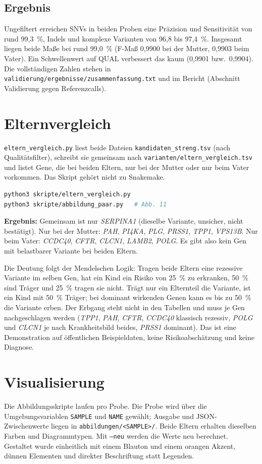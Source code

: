 \documentclass[10pt,a4paper,twocolumn]{article}
\newcommand{\gene}[1]{\textit{#1}}
\begin{document}
\subsection{Ergebnis}
Ungefiltert erreichen SNVs in beiden Proben eine Präzision und Sensitivität von rund 99,3~\%, Indels und komplexe Varianten von 96,8 bis 97,4~\%. Insgesamt liegen beide Maße bei rund 99,0~\% (F-Maß 0,9900 bei der Mutter, 0,9903 beim Vater). Ein Schwellenwert auf QUAL verbessert das kaum (0,9901 bzw.\ 0,9904). Die vollständigen Zahlen stehen in \texttt{validierung/ergebnisse/zusammenfassung.txt} und im Bericht (Abschnitt Validierung gegen Referenzcalls).

\section{Elternvergleich}
\texttt{eltern\_vergleich.py} liest beide Dateien \texttt{kandidaten\_streng.tsv} (nach Qualitätsfilter), schreibt sie gemeinsam nach \texttt{varianten/eltern\_vergleich.tsv} und listet Gene, die bei beiden Eltern, nur bei der Mutter oder nur beim Vater vorkommen. Das Skript gehört nicht zu Snakemake.
\begin{lstlisting}[language=bash]
python3 skripte/eltern_vergleich.py
python3 skripte/abbildung_paar.py   # Abb. 11
\end{lstlisting}
\textbf{Ergebnis:} Gemeinsam ist nur \gene{SERPINA1} (dieselbe Variante, unsicher, nicht bestätigt). Nur bei der Mutter: \gene{PAH}, \gene{PI4KA}, \gene{PLG}, \gene{PRSS1}, \gene{TPP1}, \gene{VPS13B}. Nur beim Vater: \gene{CCDC40}, \gene{CFTR}, \gene{CLCN1}, \gene{LAMB2}, \gene{POLG}. Es gibt also kein Gen mit belastbarer Variante bei beiden Eltern.
 
Die Deutung folgt der Mendelschen Logik: Tragen beide Eltern eine rezessive Variante im selben Gen, hat ein Kind ein Risiko von 25~\% zu erkranken, 50~\% sind Träger und 25~\% tragen sie nicht. Trägt nur ein Elternteil die Variante, ist ein Kind mit 50~\% Träger; bei dominant wirkenden Genen kann es bis zu 50~\% die Variante erben. Der Erbgang steht nicht in den Tabellen und muss je Gen nachgeschlagen werden (\gene{TPP1}, \gene{PAH}, \gene{CFTR}, \gene{CCDC40} klassisch rezessiv, \gene{POLG} und \gene{CLCN1} je nach Krankheitsbild beides, \gene{PRSS1} dominant). Das ist eine Demonstration auf öffentlichen Beispieldaten, keine Risikoabschätzung und keine Diagnose.
 
\section{Visualisierung}
Die Abbildungsskripte laufen pro Probe. Die Probe wird über die Umgebungsvariablen \texttt{SAMPLE} und \texttt{NAME} gewählt; Ausgabe und JSON-Zwischenwerte liegen in \texttt{abbildungen/<SAMPLE>/}. Beide Eltern erhalten dieselben Farben und Diagrammtypen. Mit \texttt{--neu} werden die Werte neu berechnet. Gestaltet wurde einheitlich mit einem Blauton und einem orangen Akzent, dünnen Elementen und direkter Beschriftung statt Legenden.
 
\end{document}
